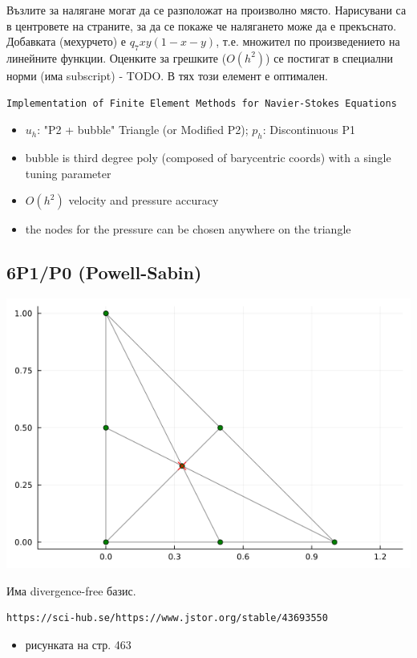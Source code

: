 \documentclass[fleqn,12pt]{article}
\begin{document}
Възлите за налягане могат да се разположат на произволно място.
Нарисувани са в центровете на страните, за да се покаже че налягането може да е прекъснато.
Добавката (мехурчето) е $q_7 xy(1-x-y)$, т.е. множител по произведението на линейните функции.
Оценките за грешките ($O(h^2)$) се постигат в специални норми (има subscript) - TODO.
В тях този елемент е оптимален.

\begin{verbatim}
Implementation of Finite Element Methods for Navier-Stokes Equations
\end{verbatim}
\begin{itemize}
\item $u_h$: "P2 + bubble" Triangle (or Modified P2); $p_h$: Discontinuous P1
\item bubble is third degree poly (composed of barycentric coords) with a single tuning parameter
\item $O(h^2)$ velocity and pressure accuracy
\item the nodes for the pressure can be chosen anywhere on the triangle
\end{itemize}

\subsection{6P1/P0 (Powell-Sabin)}
\includegraphics[width=140mm]{img/6p1p0.png}

Има divergence-free базис.

\begin{verbatim}
https://sci-hub.se/https://www.jstor.org/stable/43693550
\end{verbatim}
\begin{itemize}
    \item рисунката на стр. 463
\end{itemize}
\end{document}
